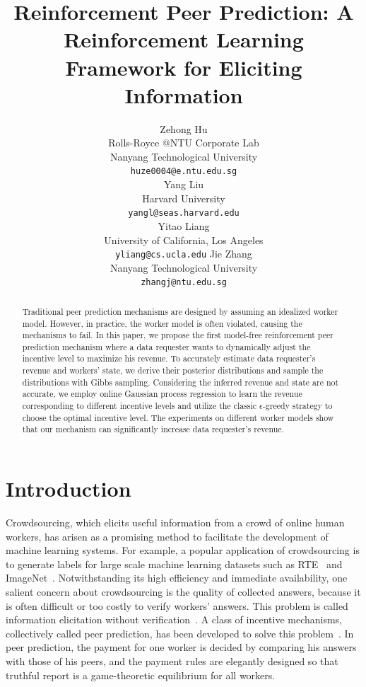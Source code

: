 \documentclass{article}
\title{Reinforcement Peer Prediction: A Reinforcement Learning Framework for Eliciting Information}
\author{
  Zehong Hu \\
  Rolls-Royce @NTU Corporate Lab\\
  Nanyang Technological University\\
  \texttt{huze0004@e.ntu.edu.sg} \\
  \And
  Yang Liu \\
  Harvard University \\
  \texttt{yangl@seas.harvard.edu}\\
  \And
  Yitao Liang \\
  University of California, Los Angeles \\
  \texttt{yliang@cs.ucla.edu}
   \And
  Jie Zhang \\
  Nanyang Technological University \\
  \texttt{zhangj@ntu.edu.sg}
}
\begin{document}

\maketitle

\begin{abstract}
Traditional peer prediction mechanisms are designed by assuming an idealized worker model.
However, in practice, the worker model is often violated, causing the mechanisms to fail.
In this paper, we propose the first model-free reinforcement peer prediction mechanism where a data requester wants to dynamically adjust the incentive level to maximize his revenue.
To accurately estimate data requester's revenue and workers' state, we derive their posterior distributions and sample the distributions with Gibbs sampling.
Considering the inferred revenue and state are not accurate, we employ online Gaussian process regression to learn the revenue corresponding to different incentive levels and utilize the classic $\epsilon$-greedy strategy to choose the optimal incentive level.
The experiments on different worker models show that our mechanism can significantly increase data requester's revenue.
\end{abstract}

\section{Introduction}
Crowdsourcing, which elicits useful information from a crowd of online human workers, has arisen as a promising method to facilitate the development of machine learning systems.
For example, a popular application of crowdsourcing is to generate labels for large scale machine learning datasets such as RTE~\cite{snow2008cheap} and ImageNet~\cite{deng2009imagenet}.
Notwithstanding its high efficiency and immediate availability, one salient concern about crowdsourcing is the quality of collected answers, because it is often difficult or too costly to verify workers' answers.
This problem is called information elicitation without verification~\cite{waggoner2014output}.
A class of incentive mechanisms, collectively called peer prediction, has been developed to solve this problem~\cite{miller2005eliciting,jurca2009mechanisms,witkowski2012robust,witkowski2012peer,radanovic2013robust}.
In peer prediction, the payment for one worker is decided by comparing his answers with those of his peers, and the payment rules are elegantly designed so that truthful report is a game-theoretic equilibrium for all workers.
\end{document}
